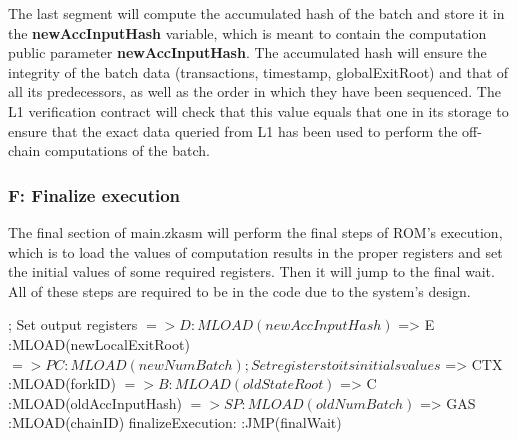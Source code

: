 The last segment will compute the accumulated hash of the batch and store it in the \textbf{newAccInputHash} variable, which is meant to contain the computation public parameter \textbf{newAccInputHash}. The accumulated hash will ensure the integrity of the batch data (transactions, timestamp, globalExitRoot) and that of all its predecessors, as well as the order in which they have been sequenced. The L1 verification contract will check that this value equals that one in its storage to ensure that the exact data queried from L1 has been used to perform the off-chain computations of the batch.




\subsubsection{F: Finalize execution}

The final section of main.zkasm will perform the final steps of ROM's execution, which is to load the values of computation results in the proper registers and set the initial values of some required registers. Then it will jump to the final wait. All of these steps are required to be in the code due to the system's design.

\begin{zkasm}
; Set output registers
$ => D                          :MLOAD(newAccInputHash)
$ => E                          :MLOAD(newLocalExitRoot)
$ => PC                         :MLOAD(newNumBatch)

; Set registers to its initials values
$ => CTX                        :MLOAD(forkID)
$ => B                          :MLOAD(oldStateRoot)
$ => C                          :MLOAD(oldAccInputHash)
$ => SP                         :MLOAD(oldNumBatch)
$ => GAS                        :MLOAD(chainID)
finalizeExecution:
:JMP(finalWait)
\end{zkasm}









